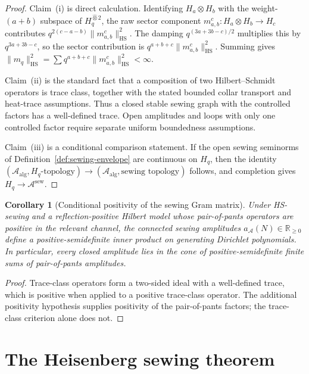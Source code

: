 \documentclass[11pt,reqno]{amsart}
\newtheorem{corollary}[theorem]{Corollary}
\theoremstyle{definition}
\theoremstyle{remark}
\newcommand{\cA}{\mathcal{A}}
\newcommand{\HS}{\mathrm{HS}}
\numberwithin{equation}{section}
\begin{document}
\begin{proof}
Claim~(i) is direct calculation. Identifying $H_a \otimes H_b$
with the weight-$(a+b)$ subspace of $H_q^{\widehat{\otimes} 2}$,
	the raw sector component $m_{a,b}^c \colon H_a \otimes H_b \to H_c$
	contributes $q^{2(c-a-b)}\|m_{a,b}^c\|_{\HS}^2$. The damping
	$q^{(3a+3b-c)/2}$ multiplies this by $q^{3a+3b-c}$, so the sector
	contribution is $q^{a+b+c}\|m_{a,b}^c\|_{\HS}^2$. Summing gives
$\|m_q\|_{\HS}^2 = \sum q^{a+b+c} \|m_{a,b}^c\|_{\HS}^2 < \infty$.

Claim~(ii) is the standard fact that a composition of two
Hilbert--Schmidt operators is trace class, together with the stated
bounded collar transport and heat-trace assumptions. Thus a closed
stable sewing graph with the controlled factors has a well-defined
trace. Open amplitudes and loops with only one controlled factor
require separate uniform boundedness assumptions.

Claim~(iii) is a conditional comparison statement. If the open
sewing seminorms of Definition~\ref{def:sewing-envelope} are
continuous on $H_q$, then the identity
$(\cA_{\mathrm{alg}},H_q\text{-topology}) \to
(\cA_{\mathrm{alg}},\text{sewing topology})$ follows, and completion
gives $H_q \to \cA^{\mathrm{sew}}$.
\end{proof}

\begin{corollary}[Conditional positivity of the sewing Gram matrix]
\label{cor:hs-positivity}
Under HS-sewing and a reflection-positive Hilbert model whose
pair-of-pants operators are positive in the relevant channel, the
connected sewing amplitudes
$a_\cA(N) \in \mathbb{R}_{\geq 0}$ define a positive-semidefinite
inner product on generating Dirichlet polynomials. In particular,
every closed amplitude lies in the cone of positive-semidefinite
finite sums of pair-of-pants amplitudes.
\end{corollary}

\begin{proof}
Trace-class operators form a two-sided ideal with a well-defined
trace, which is positive when applied to a positive trace-class
operator. The additional positivity hypothesis supplies positivity
of the pair-of-pants factors; the trace-class criterion alone does
not.
\end{proof}

\section{The Heisenberg sewing theorem}\label{sec:heisenberg}
\end{document}

